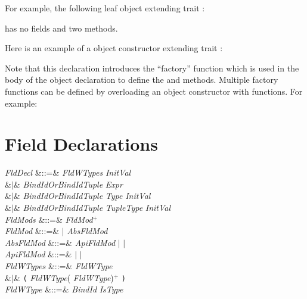 For example, the following leaf object extending trait :

has no fields and two methods.



Here is an example of a  object constructor extending
trait :

Note that this declaration introduces the ``factory'' function
which is used in the body of the object declaration to define the 
and  methods.
Multiple factory functions can be defined by overloading an
object constructor with functions.  For example:




\section{Field Declarations}

\begin{Grammar}
\emph{FldDecl}
&::=&  \emph{FldWTypes} \emph{InitVal} \\
&$|$& \emph{BindIdOrBindIdTuple} \EXP{=} \emph{Expr}\\
&$|$&  \emph{BindIdOrBindIdTuple} \EXP{\mathrel{\mathtt{:}}} \emph{Type}
\emph{InitVal} \\
&$|$&  \emph{BindIdOrBindIdTuple} \EXP{\mathrel{\mathtt{:}}} \emph{TupleType}
\emph{InitVal} \\

\emph{FldMods} &::=& \emph{FldMod}$^+$\\

\emph{FldMod} &::=&  $|$ \emph{AbsFldMod}\\

\emph{AbsFldMod} &::=& \emph{ApiFldMod} $|$  $|$ \\

\emph{ApiFldMod} &::=&  $|$  $|$ \\

\emph{FldWTypes} &::=& \emph{FldWType} \\
&$|$& \texttt{(} \emph{FldWType}(\EXP{,} \emph{FldWType})$^+$ \texttt{)}\\

\emph{FldWType} &::=& \emph{BindId} \emph{IsType}\\

\end{Grammar}


